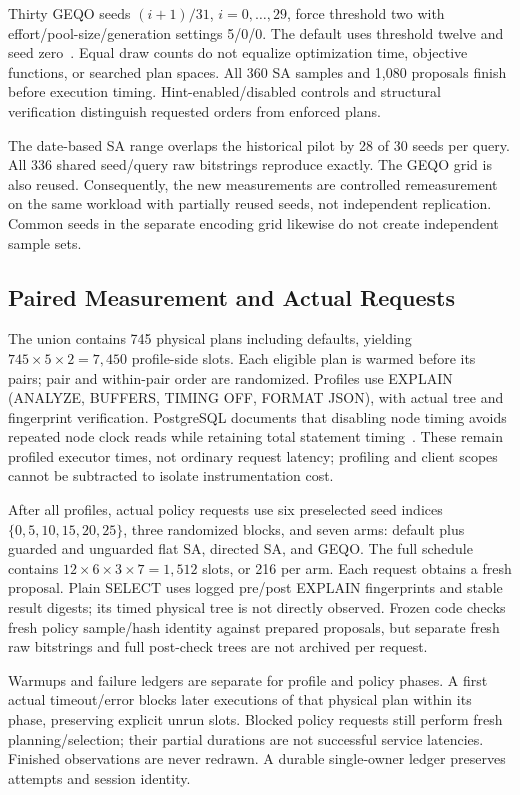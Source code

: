 \documentclass[conference]{IEEEtran}
\begin{document}
Thirty GEQO seeds $(i+1)/31$, $i=0,\ldots,29$, force threshold two with
 effort/pool-size/generation settings 5/0/0. The default uses threshold twelve
and seed zero~\cite{postgres18geqo}. Equal draw counts do not equalize optimization
time, objective functions, or searched plan spaces. All 360 SA samples and 1,080
proposals finish before execution timing. Hint-enabled/disabled controls and
structural verification distinguish requested orders from enforced plans.

The date-based SA range overlaps the historical pilot by 28 of 30 seeds per
query. All 336 shared seed/query raw bitstrings reproduce exactly. The GEQO grid
is also reused. Consequently, the new measurements are controlled remeasurement
on the same workload with partially reused seeds, not independent replication.
Common seeds in the separate encoding grid likewise do not create independent
sample sets.

\subsection{Paired Measurement and Actual Requests}
The union contains 745 physical plans including defaults, yielding $745\times
5\times2=7,450$ profile-side slots. Each eligible plan is warmed before its pairs;
pair and within-pair order are randomized. Profiles use EXPLAIN (ANALYZE, BUFFERS,
TIMING OFF, FORMAT JSON), with actual tree and fingerprint verification.
PostgreSQL documents that disabling node timing avoids repeated node clock reads
while retaining total statement timing~\cite{postgres18explain}. These remain
profiled executor times, not ordinary request latency; profiling and client scopes
cannot be subtracted to isolate instrumentation cost.

After all profiles, actual policy requests use six preselected seed indices
$\{0,5,10,15,20,25\}$, three randomized blocks, and seven arms: default plus guarded
and unguarded flat SA, directed SA, and GEQO. The full schedule contains
$12\times6\times3\times7=1,512$ slots, or 216 per arm. Each request obtains a
fresh proposal. Plain SELECT uses logged pre/post EXPLAIN fingerprints and stable
result digests; its timed physical tree is not directly observed. Frozen code
checks fresh policy sample/hash identity against prepared proposals, but separate
fresh raw bitstrings and full post-check trees are not archived per request.

Warmups and failure ledgers are separate for profile and policy phases. A first
actual timeout/error blocks later executions of that physical plan within its
phase, preserving explicit unrun slots. Blocked policy requests still perform
fresh planning/selection; their partial durations are not successful service
latencies. Finished observations are never redrawn. A durable single-owner ledger
preserves attempts and session identity.
\end{document}
